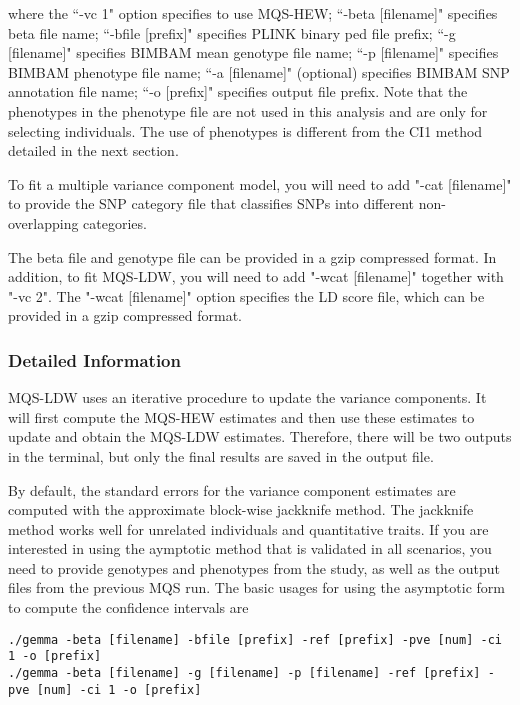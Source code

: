 \documentclass[11pt]{article}
\begin{document}
where the ``-vc 1" option specifies to use MQS-HEW; ``-beta
[filename]" specifies beta file name; ``-bfile [prefix]" specifies
PLINK binary ped file prefix; ``-g [filename]" specifies BIMBAM mean
genotype file name; ``-p [filename]" specifies BIMBAM phenotype file
name; ``-a [filename]" (optional) specifies BIMBAM SNP annotation file
name; ``-o [prefix]" specifies output file prefix. Note that the
phenotypes in the phenotype file are not used in this analysis and are
only for selecting individuals. The use of phenotypes is different
from the CI1 method detailed in the next section.

To fit a multiple variance component model, you will need to add "-cat
[filename]" to provide the SNP category file that classifies SNPs into
different non-overlapping categories.

The beta file and genotype file can be provided in a gzip compressed
format. In addition, to fit MQS-LDW, you will need to add "-wcat
[filename]" together with "-vc 2". The "-wcat [filename]" option
specifies the LD score file, which can be provided in a gzip
compressed format.

\subsubsection{Detailed Information}

MQS-LDW uses an iterative procedure to update the variance
components. It will first compute the MQS-HEW estimates and then use
these estimates to update and obtain the MQS-LDW estimates. Therefore,
there will be two outputs in the terminal, but only the final results
are saved in the output file.

By default, the standard errors for the variance component estimates
are computed with the approximate block-wise jackknife method.  The
jackknife method works well for unrelated individuals and quantitative
traits. If you are interested in using the aymptotic method that is
validated in all scenarios, you need to provide genotypes and
phenotypes from the study, as well as the output files from the
previous MQS run. The basic usages for using the asymptotic form to
compute the confidence intervals are

\begin{verbatim}
./gemma -beta [filename] -bfile [prefix] -ref [prefix] -pve [num] -ci 1 -o [prefix]
./gemma -beta [filename] -g [filename] -p [filename] -ref [prefix] -pve [num] -ci 1 -o [prefix]
\end{verbatim}
\end{document}
